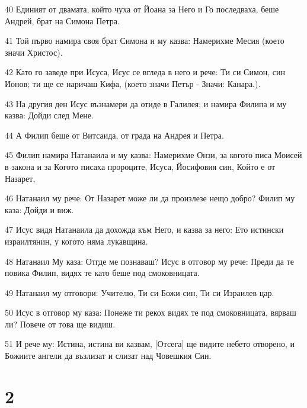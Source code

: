 \par 40 Единият от двамата, който чуха от Йоана за Него и Го последваха, беше Андрей, брат на Симона Петра.
\par 41 Той първо намира своя брат Симона и му казва: Намерихме Месия (което значи Христос).
\par 42 Като го заведе при Исуса, Исус се вгледа в него и рече: Ти си Симон, син Ионов; ти ще се наричаш Кифа, (което значи Петър - Значи: Канара.).
\par 43 На другия ден Исус възнамери да отиде в Галилея; и намира Филипа и му казва: Дойди след Мене.
\par 44 А Филип беше от Витсаида, от града на Андрея и Петра.
\par 45 Филип намира Натанаила и му казва: Намерихме Онзи, за когото писа Моисей в закона и за Когото писаха пророците, Исуса, Йосифовия син, Който е от Назарет,
\par 46 Натанаил му рече: От Назарет може ли да произлезе нещо добро? Филип му каза: Дойди и виж.
\par 47 Исус видя Натанаила да дохожда към Него, и казва за него: Ето истински израилтянин, у когото няма лукавщина.
\par 48 Натанаил Му каза: Отгде ме познаваш? Исус в отговор му рече: Преди да те повика Филип, видях те като беше под смоковницата.
\par 49 Натанаил му отговори: Учителю, Ти си Божи син, Ти си Израилев цар.
\par 50 Исус в отговор му каза: Понеже ти рекох видях те под смоковницата, вярваш ли? Повече от това ще видиш.
\par 51 И рече му: Истина, истина ви казвам, [Отсега] ще видите небето отворено, и Божиите ангели да възлизат и слизат над Човешкия Син.

\chapter{2}

